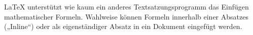 LaTeX unterstützt wie kaum ein anderes Textsatzungsprogramm das Einfügen mathematischer Formeln. Wahlweise können Formeln innerhalb einer Absatzes („Inline“) oder als eigenständiger Absatz in ein Dokument eingefügt werden.

